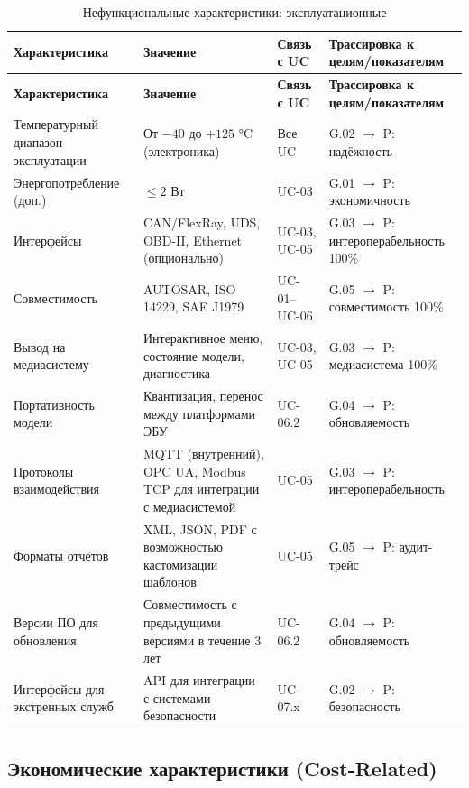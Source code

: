 \documentclass[14pt, a4paper]{extarticle}
\begin{document}
				\begin{xltabular}{\textwidth}{|L|L|L|L|}
					\caption{Нефункциональные характеристики: эксплуатационные}\label{tab:nfr-operational}\\
					\hline
					\textbf{Характеристика} & \textbf{Значение} & \textbf{Связь с UC} & \textbf{Трассировка к целям/показателям} \\
					\hline
					\endfirsthead
					\hline
					\textbf{Характеристика} & \textbf{Значение} & \textbf{Связь с UC} & \textbf{Трассировка к целям/показателям} \\
					\hline
					\endhead
					\hline
					\endfoot
					\hline
					\endlastfoot
					Температурный диапазон эксплуатации & От \(-40\) до \(+125\) °C (электроника) & Все UC & G.02 \(\to\) P: надёжность \\
					\hline
					Энергопотребление (доп.) & \(\leq 2\) Вт & UC-03 & G.01 \(\to\) P: экономичность \\
					\hline
					Интерфейсы & CAN/FlexRay, UDS, OBD-II, Ethernet (опционально) & UC-03, UC-05 & G.03 \(\to\) P: интероперабельность 100\% \\
					\hline
					Совместимость & AUTOSAR, ISO 14229, SAE J1979 & UC-01–UC-06 & G.05 \(\to\) P: совместимость 100\% \\
					\hline
					Вывод на медиасистему & Интерактивное меню, состояние модели, диагностика & UC-03, UC-05 & G.03 \(\to\) P: медиасистема 100\% \\
					\hline
					Портативность модели & Квантизация, перенос между платформами ЭБУ & UC-06.2 & G.04 \(\to\) P: обновляемость \\
					\hline
					Протоколы взаимодействия & MQTT (внутренний), OPC UA, Modbus TCP для интеграции с медиасистемой & UC-05 & G.03 \(\to\) P: интероперабельность \\
					\hline
					Форматы отчётов & XML, JSON, PDF с возможностью кастомизации шаблонов & UC-05 & G.05 \(\to\) P: аудит-трейс \\
					\hline
					Версии ПО для обновления & Совместимость с предыдущими версиями в течение 3 лет & UC-06.2 & G.04 \(\to\) P: обновляемость \\
					\hline
					Интерфейсы для экстренных служб & API для интеграции с системами безопасности & UC-07.x & G.02 \(\to\) P: безопасность \\
					\hline
				\end{xltabular}
				
				\subsection{Экономические характеристики (Cost-Related)}
				
\end{document}
